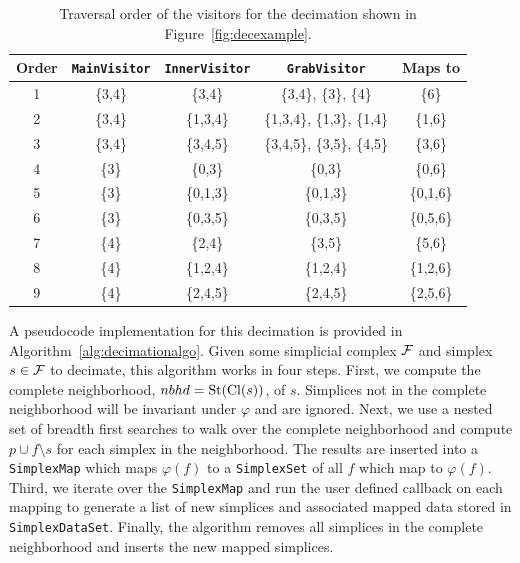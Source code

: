 \begin{table}[ht!]
  \centering
  \caption{Traversal order of the visitors for the decimation shown in Figure~\ref{fig:decexample}.}
	\begin{tabular}{@{}ccccc@{}}
		\toprule
		Order 	& \verb|MainVisitor|& \verb|InnerVisitor|	& \verb|GrabVisitor| 			& Maps to 	\\ \midrule
		1		& \{3,4\} 			& \{3,4\} 				& \{3,4\}, \{3\}, \{4\} 		& \{6\}		\\
		2		& \{3,4\}			& \{1,3,4\} 			& \{1,3,4\}, \{1,3\}, \{1,4\} 	& \{1,6\}	\\
		3		& \{3,4\}			& \{3,4,5\}				& \{3,4,5\}, \{3,5\}, \{4,5\} 	& \{3,6\}	\\
		4		& \{3\} 			& \{0,3\} 				& \{0,3\} 						& \{0,6\}	\\
		5		& \{3\}				& \{0,1,3\}				& \{0,1,3\} 					& \{0,1,6\}	\\
		6		& \{3\}				& \{0,3,5\}				& \{0,3,5\} 					& \{0,5,6\}	\\
		7		& \{4\}				& \{2,4\}				& \{3,5\}						& \{5,6\}	\\
		8		& \{4\}				& \{1,2,4\}				& \{1,2,4\}						& \{1,2,6\}	\\
		9		& \{4\}				& \{2,4,5\}				& \{2,4,5\} 					& \{2,5,6\}	\\
    \bottomrule
	\end{tabular}
	\label{tab:decimateorder}
\end{table}

		\par A pseudocode implementation for this decimation is provided in Algorithm~\ref{alg:decimationalgo}.
		Given some simplicial complex $\mathcal{F}$ and simplex $s \in \mathcal{F}$ to decimate, this algorithm works in four steps.
		First, we compute the complete neighborhood, $nbhd = \operatorname{St}(\operatorname{Cl}(s))$, of $s$. Simplices not in the complete neighborhood will be invariant under $\varphi$ and are ignored.
		Next, we use a nested set of breadth first searches to walk over the complete neighborhood and compute $p \cup f \setminus s$ for each simplex in the neighborhood.
		The results are inserted into a \verb|SimplexMap| which maps $\varphi(f)$ to a \verb|SimplexSet| of all $f$ which map to $\varphi(f)$.
		Third, we iterate over the \verb|SimplexMap| and run the user defined callback on each mapping to generate a list of new simplices and associated mapped data stored in \verb|SimplexDataSet|.
		Finally, the algorithm removes all simplices in the complete neighborhood and inserts the new mapped simplices.

